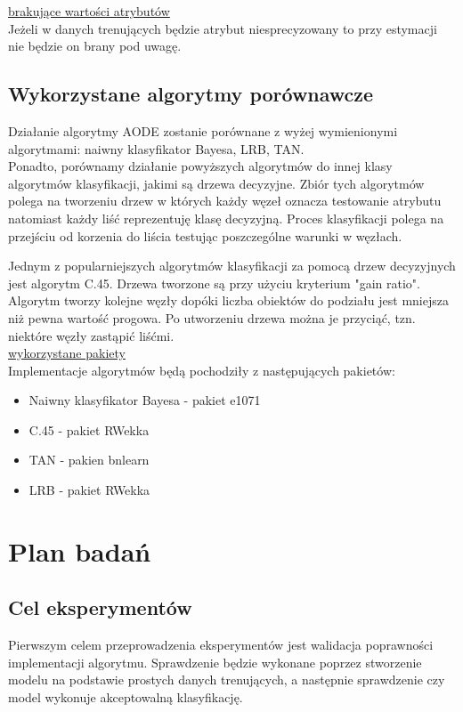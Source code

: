 \documentclass[16]{article}
\begin{document}
\underline{brakujące wartości atrybutów} \\
Jeżeli w danych trenujących będzie atrybut niesprecyzowany to przy estymacji nie będzie on brany pod uwagę.

\subsection{Wykorzystane algorytmy porównawcze}

Działanie algorytmy AODE zostanie porównane z wyżej wymienionymi algorytmami: naiwny klasyfikator Bayesa, LRB, TAN. \\

Ponadto, porównamy działanie powyższych algorytmów do innej klasy algorytmów klasyfikacji, jakimi są drzewa decyzyjne. Zbiór tych algorytmów polega na tworzeniu drzew w których każdy węzeł oznacza testowanie atrybutu natomiast każdy liść reprezentuję klasę decyzyjną. Proces klasyfikacji polega na przejściu od korzenia do liścia testując poszczególne warunki w węzłach.

Jednym z popularniejszych algorytmów klasyfikacji za pomocą drzew decyzyjnych jest algorytm C.45. Drzewa tworzone są przy użyciu kryterium "gain ratio". Algorytm tworzy kolejne węzły dopóki liczba obiektów do podziału jest mniejsza niż pewna wartość progowa. Po utworzeniu drzewa można je przyciąć, tzn. niektóre węzły zastąpić liśćmi.\\

\underline{wykorzystane pakiety} \\
Implementacje algorytmów będą pochodziły z następujących pakietów:
\begin{itemize}
	\item Naiwny klasyfikator Bayesa - pakiet e1071
	\item C.45 - pakiet RWekka
	\item TAN - pakien bnlearn
	\item LRB - pakiet RWekka
\end{itemize}

\section{Plan badań}
\subsection{Cel eksperymentów}
Pierwszym celem przeprowadzenia eksperymentów jest walidacja poprawności implementacji algorytmu. Sprawdzenie będzie wykonane poprzez stworzenie modelu na podstawie prostych danych trenujących, a następnie sprawdzenie czy model wykonuje akceptowalną klasyfikację.\\
\end{document}
